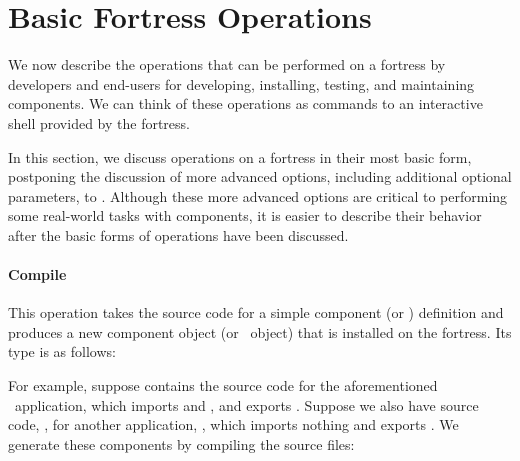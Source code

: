 %
%
%
%

\renewcommand{\api}{A}
\section{Basic Fortress Operations}

We now describe the operations that can be performed on a fortress
by developers and end-users
for developing, installing, testing, and maintaining components.
We can think of these operations
as commands to an interactive shell provided by the fortress.

In this section,
we discuss operations on a fortress in their most basic form,
postponing the discussion of more advanced options,
including additional optional parameters,
to .
Although these more advanced options are critical to performing
some real-world tasks with components,
it is easier to describe their behavior
after the basic forms of operations have been discussed.

\paragraph{Compile}
This operation takes the source code
for a simple component (or \apiN) definition
and produces a new component object (or \apiN\ object)
that is installed on the fortress.
Its type is as follows:


For example,
suppose  contains
the source code for the aforementioned
\ironcryp\ application,
which imports 
and ,
and exports
.
Suppose we also have source code, , for another
application, \ironio, which imports nothing and exports .
We generate these components by compiling the source files:

